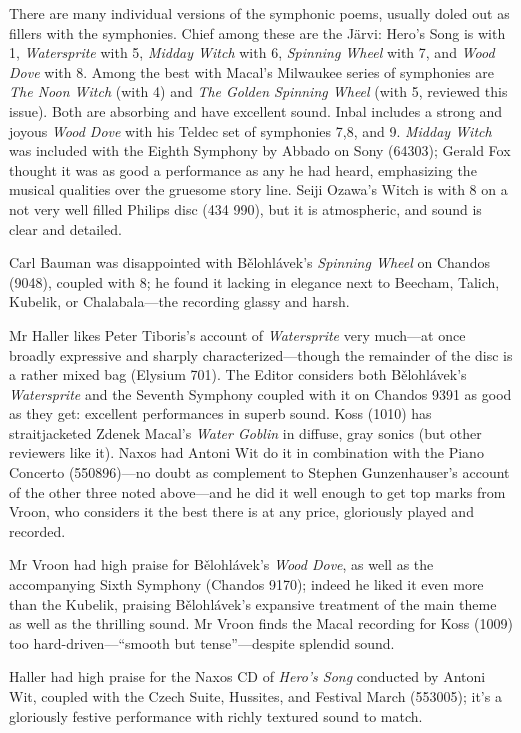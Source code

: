 \documentclass[12pt]{article}%
\begin{document}
There are many individual versions of the symphonic poems, usually doled out as fillers with the symphonies. Chief among these are the Järvi: Hero's Song is with 1, {\it Watersprite} with 5, {\it Midday Witch} with 6, {\it Spinning Wheel} with 7, and {\it Wood Dove} with 8. Among the best with Macal's Milwaukee series of symphonies are {\it The Noon Witch} (with 4) and {\it The Golden Spinning Wheel} (with 5, reviewed this issue).
Both are absorbing and have excellent sound.
Inbal includes a strong and joyous {\it Wood Dove} with his Teldec set of symphonies 7,8, and 9.
{\it Midday Witch} was included with the Eighth Symphony by Abbado on Sony (64303); Gerald Fox thought it was as good a performance as any he had heard, emphasizing the musical qualities over the gruesome story line. Seiji Ozawa's Witch is with 8 on a not very well filled Philips disc (434 990), but it is atmospheric, and sound is clear and detailed.

Carl Bauman was disappointed with Bělohlávek's {\it Spinning Wheel} on Chandos
(9048), coupled with 8; he found it lacking in elegance next to Beecham, Talich, Kubelik, or Chalabala---the recording glassy and harsh.

Mr Haller likes Peter Tiboris's account of {\it Watersprite} very much---at once broadly expressive and sharply characterized---though the remainder of the disc is a rather mixed bag (Elysium 701). The Editor considers both Bělohlávek's {\it Watersprite} and the Seventh Symphony coupled with it on Chandos 9391 as good as they get: excellent performances in superb sound. Koss (1010) has straitjacketed Zdenek Macal's {\it Water Goblin} in diffuse, gray sonics (but other reviewers like it). Naxos had Antoni Wit do it in combination with the Piano Concerto (550896)---no doubt as complement to Stephen Gunzenhauser's account of the other three noted above---and he did it well enough to get top marks from Vroon, who considers it the best there is at any price, gloriously played and recorded.

Mr Vroon had high praise for Bělohlávek's {\it Wood Dove}, as well as the accompanying Sixth Symphony (Chandos 9170); indeed he liked it even more than the Kubelik, praising Bělohlávek's expansive treatment of the main theme as well as the thrilling sound. Mr Vroon finds the Macal recording for Koss (1009) too hard-driven---``smooth but tense''---despite splendid sound.

Haller had high praise for the Naxos CD of {\it Hero's Song} conducted by Antoni Wit, coupled with the Czech Suite, Hussites, and Festival March (553005); it's a gloriously festive performance with richly textured sound to match.
\end{document}

